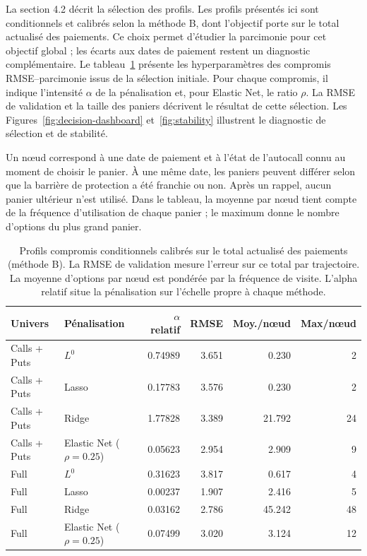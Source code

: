 \documentclass[12pt,a4paper]{article}
\newcommand{\1}{\mathbf{1}}
\begin{document}
La section 4.2 décrit la sélection des profils. Les profils présentés ici sont conditionnels et calibrés selon la méthode B, dont l'objectif porte sur le total actualisé des paiements. Ce choix permet d'étudier la parcimonie pour cet objectif global ; les écarts aux dates de paiement restent un diagnostic complémentaire. Le tableau~\ref{tab:selected} présente les hyperparamètres des compromis RMSE--parcimonie issus de la sélection initiale. Pour chaque compromis, il indique l'intensité $\alpha$ de la pénalisation et, pour Elastic Net, le ratio $\rho$. La RMSE de validation et la taille des paniers décrivent le résultat de cette sélection. Les Figures~\ref{fig:decision-dashboard} et~\ref{fig:stability} illustrent le diagnostic de sélection et de stabilité.

Un nœud correspond à une date de paiement et à l'état de l'autocall connu au moment de choisir le panier. À une même date, les paniers peuvent différer selon que la barrière de protection a été franchie ou non. Après un rappel, aucun panier ultérieur n'est utilisé. Dans le tableau, la moyenne par nœud tient compte de la fréquence d'utilisation de chaque panier ; le maximum donne le nombre d'options du plus grand panier.

\begin{table}[htbp]
\centering
\small
\begin{tabular}{llrrrr}
\toprule
Univers & Pénalisation & $\alpha$ relatif & RMSE & Moy./nœud & Max/nœud \\
\midrule
Calls + Puts & $L^0$ & 0.74989 & 3.651 & 0.230 & 2 \\
Calls + Puts & Lasso & 0.17783 & 3.576 & 0.230 & 2 \\
Calls + Puts & Ridge & 1.77828 & 3.389 & 21.792 & 24 \\
Calls + Puts & Elastic Net ($\rho=0.25$) & 0.05623 & 2.954 & 2.909 & 9 \\
Full & $L^0$ & 0.31623 & 3.817 & 0.617 & 4 \\
Full & Lasso & 0.00237 & 1.907 & 2.416 & 5 \\
Full & Ridge & 0.03162 & 2.786 & 45.242 & 48 \\
Full & Elastic Net ($\rho=0.25$) & 0.07499 & 3.020 & 3.124 & 12 \\
\bottomrule
\end{tabular}
\caption{Profils compromis conditionnels calibrés sur le total actualisé des paiements (méthode B). La RMSE de validation mesure l'erreur sur ce total par trajectoire. La moyenne d'options par nœud est pondérée par la fréquence de visite. L’alpha relatif situe la pénalisation sur l’échelle propre à chaque méthode.}
\label{tab:selected}
\end{table}
\end{document}

